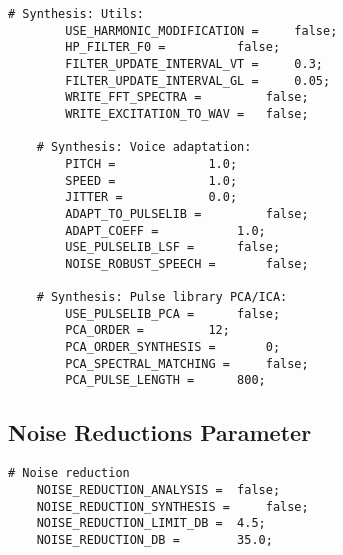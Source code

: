 \begin{lstlisting}[caption = Configuration file]
	# Synthesis: Utils:
		USE_HARMONIC_MODIFICATION = 	false;
		HP_FILTER_F0 = 			false;
		FILTER_UPDATE_INTERVAL_VT = 	0.3;
		FILTER_UPDATE_INTERVAL_GL = 	0.05;
		WRITE_FFT_SPECTRA = 		false;
		WRITE_EXCITATION_TO_WAV = 	false;

	# Synthesis: Voice adaptation:
		PITCH = 			1.0;
		SPEED = 			1.0;
		JITTER = 			0.0;
		ADAPT_TO_PULSELIB = 		false;
		ADAPT_COEFF = 			1.0;
		USE_PULSELIB_LSF = 		false;
		NOISE_ROBUST_SPEECH = 		false;

	# Synthesis: Pulse library PCA/ICA:
		USE_PULSELIB_PCA =		false;
		PCA_ORDER =			12;
		PCA_ORDER_SYNTHESIS =		0;
		PCA_SPECTRAL_MATCHING = 	false;
		PCA_PULSE_LENGTH = 		800;
\end{lstlisting}

\subsection{Noise Reductions Parameter}
\label{glott_conf_noise_red}

\begin{lstlisting}[caption = Noise reduction parameters in GlottHMM's configuration file]
# Noise reduction
	NOISE_REDUCTION_ANALYSIS = 	false;
	NOISE_REDUCTION_SYNTHESIS = 	false;
	NOISE_REDUCTION_LIMIT_DB = 	4.5;
	NOISE_REDUCTION_DB = 		35.0;
\end{lstlisting}